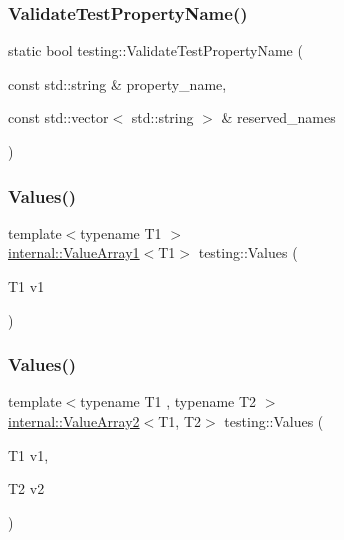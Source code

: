 \mbox{\label{namespacetesting_af251394d0785f8cd18dc178d0d766b08}} 
\subsubsection{\texorpdfstring{ValidateTestPropertyName()}{ValidateTestPropertyName()}}
{\footnotesize\ttfamily static bool testing\+::\+Validate\+Test\+Property\+Name (\begin{DoxyParamCaption}\item[{const std\+::string \&}]{property\+\_\+name,  }\item[{const std\+::vector$<$ std\+::string $>$ \&}]{reserved\+\_\+names }\end{DoxyParamCaption})\hspace{0.3cm}{\ttfamily [static]}}

\mbox{\label{namespacetesting_a8209ef59db08b8ad4beed30d8d6e6a88}} 
\subsubsection{\texorpdfstring{Values()}{Values()}\hspace{0.1cm}{\footnotesize\ttfamily [1/50]}}
{\footnotesize\ttfamily template$<$typename T1 $>$ \\
\mbox{\hyperlink{classtesting_1_1internal_1_1ValueArray1}{internal\+::\+Value\+Array1}}$<$T1$>$ testing\+::\+Values (\begin{DoxyParamCaption}\item[{T1}]{v1 }\end{DoxyParamCaption})}

\mbox{\label{namespacetesting_a7cfec131dd8773430fb87483509cc6d0}} 
\subsubsection{\texorpdfstring{Values()}{Values()}\hspace{0.1cm}{\footnotesize\ttfamily [2/50]}}
{\footnotesize\ttfamily template$<$typename T1 , typename T2 $>$ \\
\mbox{\hyperlink{classtesting_1_1internal_1_1ValueArray2}{internal\+::\+Value\+Array2}}$<$T1, T2$>$ testing\+::\+Values (\begin{DoxyParamCaption}\item[{T1}]{v1,  }\item[{T2}]{v2 }\end{DoxyParamCaption})}

